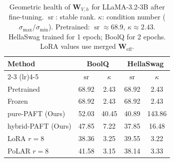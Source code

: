 \begin{table}[t]
\centering
\small
\setlength{\tabcolsep}{4pt}
\caption{Geometric health of $\mathbf{W}_{V,h}$ for LLaMA-3.2-3B after fine-tuning. $\operatorname{sr}$: stable rank. $\kappa$: condition number ($\sigma_{\max}/\sigma_{\min}$). Pretrained: $\operatorname{sr} \approx 68.9$, $\kappa \approx 2.43$. HellaSwag trained for 1 epoch; BoolQ for 2 epochs. LoRA values use merged $\mathbf{W}_{\text{eff}}$.}
\label{tab:llama_geometric}
\begin{tabular}{lcccc}
\toprule
\textbf{Method} & \multicolumn{2}{c}{\textbf{BoolQ}} & \multicolumn{2}{c}{\textbf{HellaSwag}} \\
\cmidrule(lr){2-3} \cmidrule(lr){4-5}
 & $\operatorname{sr}$ & $\kappa$ & $\operatorname{sr}$ & $\kappa$ \\
\midrule
Pretrained & 68.92 & 2.43 & 68.92 & 2.43 \\
\midrule
Frozen & 68.92 & 2.43 & 68.92 & 2.43 \\
\midrule
pure-PAFT (Ours) & 52.03 & 40.45 & 40.89 & 143.86 \\
hybrid-PAFT (Ours) & 47.85 & 7.22 & 37.85 & 16.48 \\
\midrule
LoRA $r{=}8$ & 38.36 & 3.25 & 39.55 & 3.22 \\
PoLAR $r{=}8$ & 41.58 & 3.15 & 38.14 & 3.33 \\
\bottomrule
\end{tabular}
\end{table}